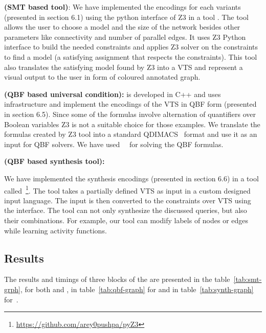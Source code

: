\textbf{{\smttool} (SMT based tool)}:
	We have implemented the encodings for each variants (presented in section 6.1) using the python interface of Z3 in a tool {\smttool}. 
%
The tool allows the user to choose a model and the size
of the network besides other parameters like connectivity and number of parallel edges. 
%		
It uses Z3 Python interface to build the needed constraints and applies Z3 solver on the constraints to find a model (a satisfying assignment that respects the constraints). 
%
This tool also translates the satisfying model found by Z3 into
a VTS and represent a visual output to the user in form of coloured annotated graph. 
%
%
 

\textbf{{\qbftool} (QBF based universal condition):}
{\qbftool} is developed in C++ and uses~\zthree~\cite{z3} infrastructure and implement the encodings of the VTS in QBF form (presented in section 6.5). 
%
Since some of the formulas involve alternation of quantifiers over
Boolean variables Z3 is not a suitable choice for those examples.
%
We translate the formulas created by Z3 tool into a standard
QDIMACS~\cite{qdimacs} format and use it as an input for QBF solvers. 
%
We have used~\depqbf~\cite{lonsing2010depqbf} for solving the QBF formulas. 

\textbf{{\ourtool} (QBF based synthesis tool):}


We have implemented the synthesis encodings (presented in section 6.6) in a tool
called~\ourtool\footnote{{\url{https://github.com/arey0pushpa/pyZ3}}}.
%
The tool takes a partially defined VTS as input in a custom designed
input language.
%
The input is then converted to the constraints over VTS using the {\qbftool} interface. 
%
The tool can not only synthesize the discussed queries, but also their
combinations.
%
For example, our tool can modify labels of nodes or edges while
learning activity functions.


\subsection{Results}
The results and timings of three blocks of the {\vtstool} are presented in the table~\ref{tab:smt-grph}, for both {\sattool} and {\smttool}, in table~\ref{tab:qbf-graph} for {\sattool} and in table~\ref{tab:synth-graph} for~{\ourtool}.



